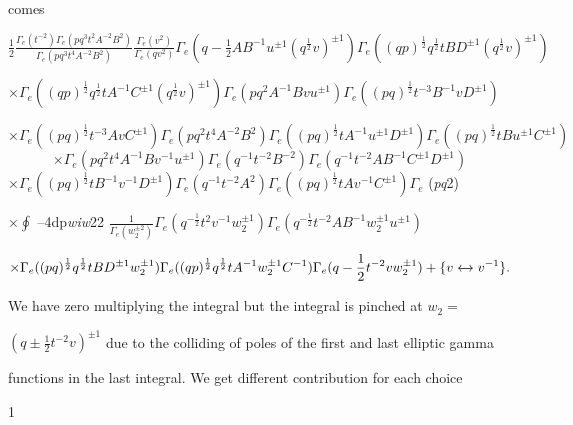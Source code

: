 \documentclass[a4paper,12pt]{article}
\begin{document}
comes

$\displaystyle \frac{1}{2}\frac{\Gamma_{e}(t^{-2})\Gamma_{e}(pq^{3}t^{2}A^{-2}B^{2})}{\Gamma_{e}(pq^{3}t^{4}A^{-2}B^{2})}\frac{\Gamma_{e}(v^{2})}{\Gamma_{e}(qv^{2})}\Gamma_{e}(q-\frac{1}{2}AB^{-1}u^{\pm 1}(q^{\frac{1}{2}}v)^{\pm 1})\Gamma_{e}((qp)^{\frac{1}{2}}q^{\frac{1}{2}}tBD^{\pm 1}(q^{\frac{1}{2}}v)^{\pm 1})$

$\times\Gamma_{e}((qp)^{\frac{1}{2}}q^{\frac{1}{2}}tA^{-1}C^{\pm 1}(q^{\frac{1}{2}}v)^{\pm 1})\Gamma_{e}(pq^{2}A^{-1}Bvu^{\pm 1})\Gamma_{e}((pq)^{\frac{1}{2}}t^{-3}B^{-1}vD^{\pm 1})$

$\times\Gamma_{e}((pq)^{\frac{1}{2}}t^{-3}AvC^{\pm 1})\Gamma_{e}(pq^{2}t^{4}A^{-2}B^{2})\Gamma_{e}((pq)^{\frac{1}{2}}tA^{-1}u^{\pm 1}D^{\pm 1})\Gamma_{e}((pq)^{\frac{1}{2}}tBu^{\pm 1}C^{\pm 1})$
$$
\times\Gamma_{e}(pq^{2}t^{4}A^{-1}Bv^{-1}u^{\pm 1})\Gamma_{e}(q^{-1}t^{-2}B^{-2})\Gamma_{e}(q^{-1}t^{-2}AB^{-1}C^{\pm 1}D^{\pm 1})
$$
$\times\Gamma_{e}((pq)^{\frac{1}{2}}tB^{-1}v^{-1}D^{\pm 1})\Gamma_{e}(q^{-1}t^{-2}A^{2})\Gamma_{e}((pq)^{\frac{1}{2}}tAv^{-1}C^{\pm 1})\Gamma_{e}$ ({\it pq}2)

$\displaystyle \times\oint$ --4dp{\it wiw}22 $\displaystyle \frac{1}{\Gamma_{e}(w_{2}^{\pm 2})}\Gamma_{e}(q^{-\frac{1}{2}}t^{2}v^{-1}w_{2}^{\pm 1})\Gamma_{e}(q^{-\frac{1}{2}}t^{-2}AB^{-1}w_{2}^{\pm 1}u^{\pm 1})$

$\displaystyle \times\Gamma_{e}((pq)^{\frac{1}{2}}q^{\frac{1}{2}}tBD^{\pm 1}w_{2}^{\pm 1})\Gamma_{e}((qp)^{\frac{1}{2}}q^{\frac{1}{2}}tA^{-1}w_{2}^{\pm 1}C^{-1})\Gamma_{e}(q-\frac{1}{2}t^{-2}vw_{2}^{\pm 1})+\{v\xleftrightarrow{}v^{-1}\}.$

We have zero multiplying the integral but the integral is pinched at $w_{2} =$

$(q\displaystyle \pm\frac{1}{2}t^{-2}v)^{\pm 1}$ due to the colliding of poles of the first and last elliptic gamma

functions in the last integral. We get different contribution for each choice

1
\end{document}
